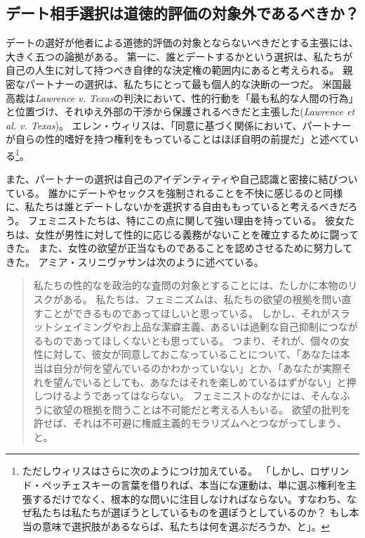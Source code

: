 \documentclass[paper=a4,book,openany]{jlreq}
\begin{document}
\subsection{デート相手選択は道徳的評価の対象外であるべきか？}

デートの選好が他者による道徳的評価の対象とならないべきだとする主張には、大きく五つの論拠がある。
第一に、誰とデートするかという選択は、私たちが自己の人生に対して持つべき自律的な決定権の範囲内にあると考えられる。
親密なパートナーの選択は、私たちにとって最も個人的な決断の一つだ。
米国最高裁は\emph{Lawrence v. Texas}の判決において、性的行動を「最も私的な人間の行為」と位置づけ、それゆえ外部の干渉から保護されるべきだと主張した(\emph{Lawrence et al. v. Texas})。
エレン・ウィリスは、「同意に基づく関係において、パートナーが自らの性的嗜好を持つ権利をもっていることはほぼ自明の前提だ」と述べている\footnote{ただしウィリスはさらに次のようにつけ加えている。
  「しかし、ロザリンド・ペッチェスキーの言葉を借りれば、本当にな運動は、単に選ぶ権利を主張するだけでなく、根本的な問いに注目しなければならない。すなわち、なぜ私たちは私たちが選ぼうとしているものを選ぼうとしているのか？ もし本当の意味で選択肢があるならば、私たちは何を選ぶだろうか、と」。
}\citep[p.14]{willis92:_no_more_nice_girls}。

また、パートナーの選択は自己のアイデンティティや自己認識と密接に結びついている。
誰かにデートやセックスを強制されることを不快に感じるのと同様に、私たちは誰とデートしないかを選択する自由ももっていると考えるべきだろう。
フェミニストたちは、特にこの点に関して強い理由を持っている。
彼女たちは、女性が男性に対して性的に応じる義務がないことを確立するために闘ってきた。
また、女性の欲望が正当なものであることを認めさせるために努力してきた。
アミア・スリニヴァサンは次のように述べている。

\begin{quote}
私たちの性的なを政治的な査問の対象とすることには、たしかに本物のリスクがある。
私たちは、フェミニズムは、私たちの欲望の根拠を問い直すことができるものであってほしいと思っている。
しかし、それがスラットシェイミングやお上品な潔癖主義、あるいは過剰な自己抑制につながるものであってほしくないとも思っている。
つまり、それが、個々の女性に対して、彼女が同意しておこなっていることについて、「あなたは本当は自分が何を望んでいるのかわかっていない」とか、「あなたが実際それを望んでいるとしても、あなたはそれを楽しめているはずがない」と押しつけるようであってはならない。
フェミニストのなかには、そんなふうに欲望の根拠を問うことは不可能だと考える人もいる。
欲望の批判を許せば、それは不可避に権威主義的モラリズムへとつながってしまう、と。
\citep{srinivasan18:_does_anyon_have_right_sex}
\end{quote}
\end{document}
